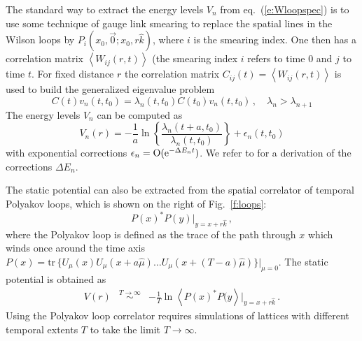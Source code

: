 \documentclass{PoS}
\newcommand{\eq}[1]{eq.~(\ref{#1})}
\newcommand{\fig}[1]{Fig.~\ref{#1}}
\newcommand{\tr}{\mathrm{tr}\,}
\newcommand{\ev}[1]{\left\langle #1 \right\rangle}
\newcommand{\gauge} [3][U]{\ensuremath{#1_{#2}(#3)}}
\begin{document}
The standard way to extract the energy levels $V_n$ from \eq{e:Wloopspec}
is to use some technique of
gauge link smearing to replace the spatial lines in the Wilson loops by
$P_i(x_0,\vec{0};x_0,r\hat{k})$, where $i$ is the smearing index.
One then has a correlation matrix $\ev{W_{ij}(r,t)}$ (the smearing index $i$
refers to time $0$ and $j$ to time $t$. 
For fixed distance $r$ the correlation matrix 
$C_{ij}(t)=\ev{W_{ij}(r,t)}$ is used to build the generalized eigenvalue problem
\begin{equation}\label{e:gevp}
C(t) v_n(t,t_0) = \lambda_n(t,t_0) C(t_0) v_n(t,t_0) \,,\quad
\lambda_n> \lambda_{n+1}
\end{equation}
The energy levels $V_n$ can be computed as \cite{Luscher:1990ck}
\begin{equation}\label{e:potentials}
V_n(r) = -\frac{1}{a}\ln\left\{
\frac{\lambda_n(t+a,t_0)}{\lambda_n(t,t_0)}\right\} + \epsilon_n(t,t_0)
\end{equation}
with exponential corrections $\epsilon_n={\rm O}({\rm e}^{-\Delta E_nt})$.
We refer to \cite{Blossier:2009kd} for a derivation of the corrections 
$\Delta E_n$.

The static potential can also be extracted from the spatial
correlator of temporal Polyakov loops, which is
shown on the right of \fig{f:loops}:
\begin{equation}
P(x)^*P(y)|_{y=x+r\hat{k}} \,,
\end{equation}
where the Polyakov loop is defined as the trace of the path through $x$ 
which winds once around the time axis
$P(x)=\tr\{\gauge{\mu}{x}\gauge{\mu}{x+a\hat{\mu}}\ldots\gauge{\mu}{x+(T-a)\hat{\mu}}\}|_{\mu=0}$.
The static potential is obtained as \cite{Luscher:2002qv}
\begin{eqnarray}
V(r) & \stackrel{T\to\infty}{\sim} & -\frac{1}{T}\ln\ev{P(x)^*P(y}|_{y=x+r\hat{k}}
\,.
\end{eqnarray}
Using the Polyakov loop correlator requires simulations of lattices with
different temporal extents $T$ to take the limit $T\to\infty$.
\end{document}
